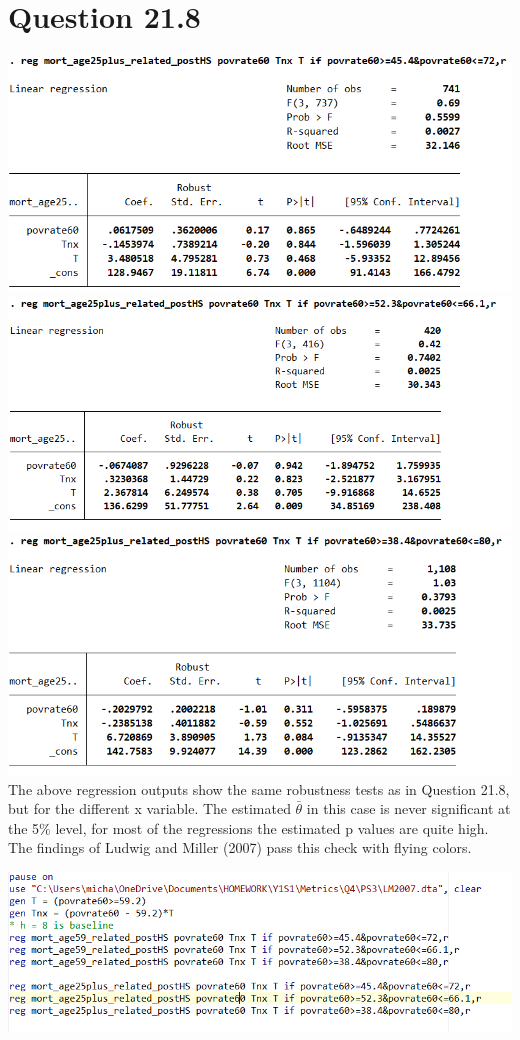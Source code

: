 \documentclass[11pt]{article} %
\begin{document}
\section{Question 21.8} %
\includegraphics{p10}\\
\includegraphics{p11}\\
\includegraphics{p12}\\

The above regression outputs show the same robustness tests as in Question 21.8, but for the different x variable. The estimated $\bar{\theta}$ in this case is never significant at the 5\% level, for most of the regressions the estimated p values are quite high. The findings of Ludwig and Miller (2007) pass this check with flying colors.

\includegraphics[scale=0.7]{p13}
\end{document}
